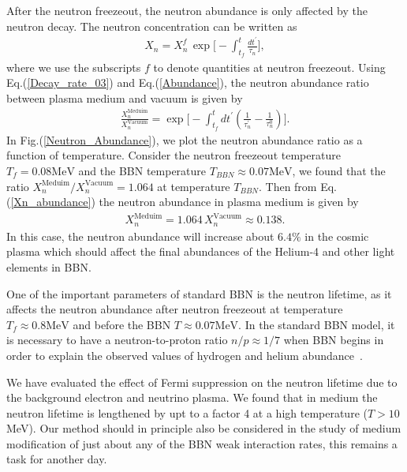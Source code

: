 After the neutron freezeout, the neutron abundance is only affected by the neutron decay. The neutron concentration can be written as 
\begin{align}
\label{Abundance}
X_n=X_n^f\,\exp\bigg[-\int^t_{t_f}\frac{dt^\prime}{\tau_n}\bigg],
\end{align}
where we use the subscripts $f$ to denote quantities at neutron freezeout. Using Eq.(\ref{Decay_rate_03}) and Eq.(\ref{Abundance}), the neutron abundance ratio between plasma medium and vacuum is given by
\begin{align}
\label{Abundance_Ratio}
\frac{X_n^{\mathrm{Meduim}}}{X_n^{\mathrm{Vacuum}}}=\exp\bigg[-\int^t_{t_f}dt^\prime\left(\frac{1}{\tau^\prime_n}-\frac{1}{\tau^0_n}\right)\bigg].
\end{align}
In Fig.(\ref{Neutron_Abundance}), we plot the neutron abundance ratio as a function of temperature. Consider the neutron freezeout temperature $T_f=0.08\mathrm{MeV}$ and the BBN temperature $T_{BBN}\approx0.07\mathrm{MeV}$, we found that the ratio ${X_n^{\mathrm{Meduim}}}/{X_n^{\mathrm{Vacuum}}}=1.064$ at temperature $T_{BBN}$. Then from Eq.(\ref{Xn_abundance}) the neutron abundance in plasma medium is given by
\begin{align}
X_n^{\mathrm{Meduim}}=1.064\,X_n^{\mathrm{Vacuum}}\approx0.138.
\end{align}
In this case, the neutron abundance will increase about $6.4\%$ in the cosmic plasma which should affect the final abundances of the Helium-4 and other light elements in BBN.



One of the important parameters of standard BBN is the neutron lifetime, as it affects the neutron abundance after neutron freezeout at temperature $T_f\approx 0.8 \mathrm{MeV}$ and before the BBN $T\approx0.07 \mathrm{MeV}$. In the standard BBN model, it is necessary to have a neutron-to-proton ratio $n/p\approx1/7$ when BBN begins in order to explain the observed values of hydrogen and helium abundance~\cite{Pitrou:2018cgg}.

We have evaluated the effect of Fermi suppression on the neutron lifetime due to the background electron and neutrino plasma. We found that in medium the neutron lifetime is lengthened by upt to a factor 4 at a high temperature ($T>10$\,MeV). Our method should in principle also be considered in the study of medium modification of just about any of the BBN weak interaction rates, this remains a task for another day.

